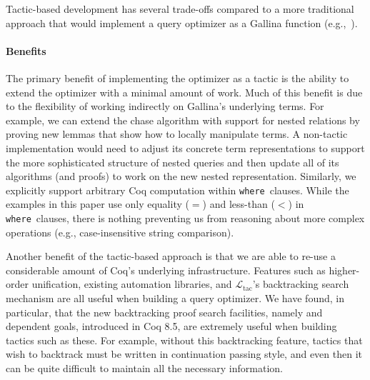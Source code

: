 \documentclass{sigplanconf}
\newcommand{\WHERE}{{\tt where}\relax\ifmmode\ \else\xspace\fi}
\newcommand{\ltac}[0]{\ensuremath{\mathcal{L}_{\mathrm{tac}}}}
\begin{document}
Tactic-based development has several trade-offs compared to a more traditional approach that would implement a query optimizer as a Gallina function (e.g.,~\cite{coqdb}).


\paragraph{Benefits}
The primary benefit of implementing the optimizer as a tactic is the ability to extend the optimizer with a minimal amount of work.
Much of this benefit is due to the flexibility of working indirectly on Gallina's underlying terms.
For example, we can extend the chase algorithm with support for nested relations by proving new lemmas that show how to locally manipulate terms.
A non-tactic implementation would need to adjust its concrete term representations to support the more sophisticated structure of nested queries and then update all of its algorithms (and proofs) to work on the new nested representation.
Similarly, we explicitly support arbitrary Coq computation within \WHERE clauses.
While the examples in this paper use only equality ($=$) and less-than ($<$) in \WHERE clauses, there is nothing preventing us from reasoning about more complex operations (e.g., case-insensitive string comparison).

Another benefit of the tactic-based approach is that we are able to re-use a considerable amount of Coq's underlying infrastructure.
Features such as higher-order unification, existing automation libraries, and \ltac's backtracking search mechanism are all useful when building a query optimizer.
We have found, in particular, that the new backtracking proof search facilities, namely \coqe{+} and dependent goals, introduced in Coq 8.5, are extremely useful when building tactics such as these.
For example, without this backtracking feature, tactics that wish to backtrack must be written in continuation passing style, and even then it can be quite difficult to maintain all the necessary information.
\end{document}
